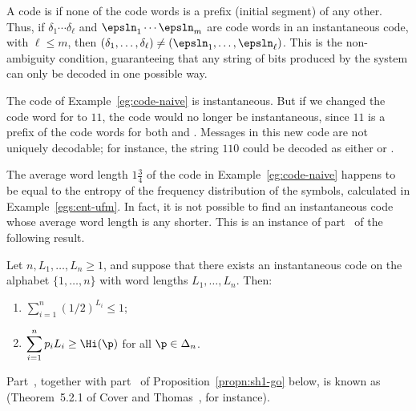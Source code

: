 A code is %
%
%
if none of the code words is a prefix (initial segment) of any other.
Thus, if $\delta_1 \cdots \delta_\ell$ and $\epsln_1 \cdots \epsln_m$ are
code words in an instantaneous code, with $\ell \leq m$, then $(\delta_1,
\ldots, \delta_\ell) \neq (\epsln_1, \ldots, \epsln_\ell)$.
% 
This is the non-ambiguity condition, guaranteeing that any string of bits
produced by the system can only be decoded in one possible way.  

\begin{example}
The code of Example~\ref{eg:code-naive} is instantaneous.  But if we changed
the code word for  to $11$, the code would no longer be
instantaneous, since $11$ is a prefix of the code words for both  and
.  Messages in this new code are not uniquely decodable; for
instance, the string $110$ could be decoded as either  or .
\end{example}

The average word length $1\tfrac{3}{4}$ of the code in
Example~\ref{eg:code-naive} happens to be equal to the entropy of the
frequency distribution of the symbols, calculated in
Example~\ref{egs:ent-ufm}.  In fact, it is not possible to find an
instantaneous code whose average word length is any shorter.  This is an
instance of part~ of the following result.

\begin{propn}
Let $n, L_1, \ldots, L_n \geq 1$, and suppose that there exists an
instantaneous code on the alphabet $\{1, \ldots, n\}$ with word lengths
$L_1, \ldots, L_n$.  Then:
% 
\begin{enumerate}
\item
{}
$\displaystyle \sum_{i = 1}^n (1/2)^{L_i} \leq 1$;

\item
{}
$\displaystyle \sum_{i = 1}^n p_i L_i \geq \Hi(\p)$ for all $\p \in
\Delta_n$. 
\end{enumerate}
\end{propn}

Part~, together with
part~ of Proposition~\ref{propn:sh1-go} below, is
known as  (Theorem~5.2.1 of Cover and Thomas~\cite{CoTh1}, for instance).

